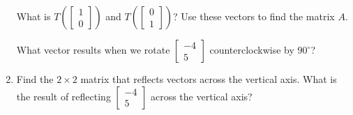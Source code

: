 \documentclass[12pt]{article}
\newcommand{\vs}[1]{\vspace{#1in}}
\newcommand{\twovec}[2]{\left[\begin{array}{r}#1 \\ #2
    \end{array}\right]}
\begin{document}
\begin{enumerate}
    What is $T\left(\twovec10\right)$ and $T\left(\twovec01\right)$?
    Use these vectors to find the matrix $A$.

    \vs{1}
    What vector results when we rotate $\twovec{-4}{5}$
    counterclockwise by $90^\circ$?

    \vs{1}
  \item Find the $2\times2$ matrix that reflects vectors across the
    vertical axis.  What is the result of reflecting $\twovec{-4}{5}$
    across the vertical axis?

\end{enumerate}
\end{document}
